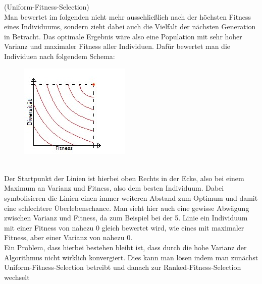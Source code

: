 \begin{algo}(Uniform-Fitness-Selection)\\
	Man bewertet im folgenden nicht mehr ausschließlich nach der höchsten Fitness eines Individuums, sondern zieht dabei auch die Vielfalt der nächsten Generation in Betracht. Das optimale Ergebnis wäre also eine Population mit sehr hoher Varianz und maximaler Fitness aller Individuen. Dafür bewertet man die Individuen nach folgendem Schema:\\
	\begin{figure}[h]
		\includegraphics[width=0.7\linewidth]{chapters/genetic/grafik.jpg}
	\end{figure}
	\\
	Der Startpunkt der Linien ist hierbei oben Rechts in der Ecke, also bei einem Maximum an Varianz und Fitness, also dem besten Individuum. Dabei symbolisieren die Linien einen immer weiteren Abstand zum Optimum und damit eine schlechtere Überlebenschance. Man sieht hier auch eine gewisse Abwägung zwischen Varianz und Fitness, da zum Beispiel bei der 5. Linie ein Individuum mit einer Fitness von nahezu 0 gleich bewertet wird, wie eines mit maximaler Fitness, aber einer Varianz von nahezu 0.\\
	Ein Problem, dass hierbei bestehen bleibt ist, dass durch die hohe Varianz der Algorithmus nicht wirklich konvergiert. Dies kann man lösen indem man zunächst Uniform-Fitness-Selection betreibt und danach zur Ranked-Fitness-Selection wechselt
\end{algo}

